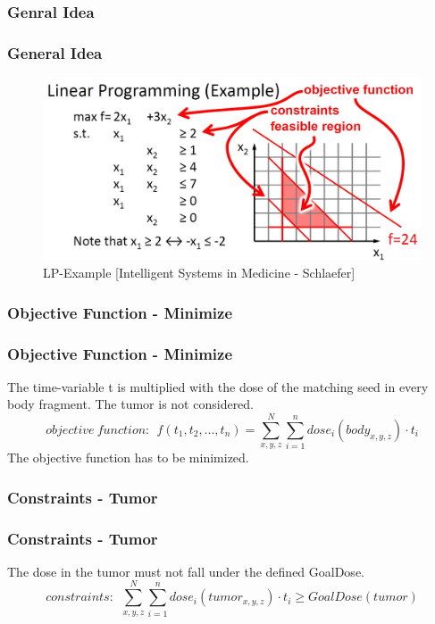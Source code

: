 \documentclass{beamer}
\begin{document}
 \subsubsection{Genral Idea}
 \begin{frame}
 \frametitle{General Idea}
 \begin{figure}[h] 
  \centering
     \includegraphics[width=1\textwidth]{LPexample.JPG}
  \caption{LP-Example [Intelligent Systems in Medicine - Schlaefer]}
  \label{fig:LPE}
\end{figure}
 \end{frame}
 
 \subsubsection{Objective Function - Minimize}
 \begin{frame}
 \frametitle{Objective Function - Minimize}
 The time-variable t is multiplied with the dose of the matching seed in every body fragment. The tumor is not considered.
 \begin{equation}
 \label{eq:lp}
 objective \ function: \ \ f(t_{1}, t_{2}, ... ,t_{n}) = 
 \sum_{x,y,z}^N \sum_{i=1}^n dose_{i}(body_{x,y,z}) \cdot t_{i}
 \end{equation}
 The objective function has to be minimized.
 \end{frame}
 
 \subsubsection{Constraints - Tumor}
 \begin{frame}
 \frametitle{Constraints - Tumor}
 The dose in the tumor must not fall under the defined GoalDose.
 \begin{equation}
 \label{eq:constr}
 constraints: \ \ \sum_{x,y,z}^N \sum_{i=1}^n dose_{i}(tumor_{x,y,z}) \cdot t_{i} \ge GoalDose(tumor)
 \end{equation}
 \end{frame}
 
\end{document}
